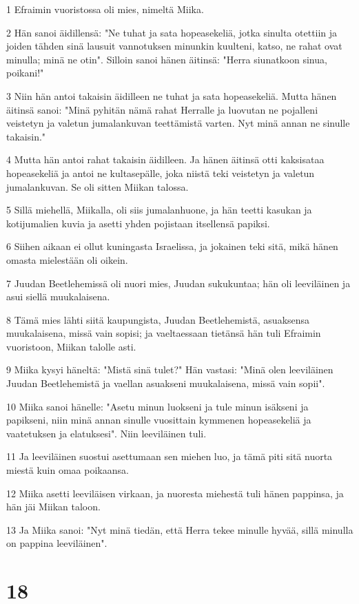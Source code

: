 \par 1 Efraimin vuoristossa oli mies, nimeltä Miika.
\par 2 Hän sanoi äidillensä: "Ne tuhat ja sata hopeasekeliä, jotka sinulta otettiin ja joiden tähden sinä lausuit vannotuksen minunkin kuulteni, katso, ne rahat ovat minulla; minä ne otin". Silloin sanoi hänen äitinsä: "Herra siunatkoon sinua, poikani!"
\par 3 Niin hän antoi takaisin äidilleen ne tuhat ja sata hopeasekeliä. Mutta hänen äitinsä sanoi: "Minä pyhitän nämä rahat Herralle ja luovutan ne pojalleni veistetyn ja valetun jumalankuvan teettämistä varten. Nyt minä annan ne sinulle takaisin."
\par 4 Mutta hän antoi rahat takaisin äidilleen. Ja hänen äitinsä otti kaksisataa hopeasekeliä ja antoi ne kultasepälle, joka niistä teki veistetyn ja valetun jumalankuvan. Se oli sitten Miikan talossa.
\par 5 Sillä miehellä, Miikalla, oli siis jumalanhuone, ja hän teetti kasukan ja kotijumalien kuvia ja asetti yhden pojistaan itsellensä papiksi.
\par 6 Siihen aikaan ei ollut kuningasta Israelissa, ja jokainen teki sitä, mikä hänen omasta mielestään oli oikein.
\par 7 Juudan Beetlehemissä oli nuori mies, Juudan sukukuntaa; hän oli leeviläinen ja asui siellä muukalaisena.
\par 8 Tämä mies lähti siitä kaupungista, Juudan Beetlehemistä, asuaksensa muukalaisena, missä vain sopisi; ja vaeltaessaan tietänsä hän tuli Efraimin vuoristoon, Miikan talolle asti.
\par 9 Miika kysyi häneltä: "Mistä sinä tulet?" Hän vastasi: "Minä olen leeviläinen Juudan Beetlehemistä ja vaellan asuakseni muukalaisena, missä vain sopii".
\par 10 Miika sanoi hänelle: "Asetu minun luokseni ja tule minun isäkseni ja papikseni, niin minä annan sinulle vuosittain kymmenen hopeasekeliä ja vaatetuksen ja elatuksesi". Niin leeviläinen tuli.
\par 11 Ja leeviläinen suostui asettumaan sen miehen luo, ja tämä piti sitä nuorta miestä kuin omaa poikaansa.
\par 12 Miika asetti leeviläisen virkaan, ja nuoresta miehestä tuli hänen pappinsa, ja hän jäi Miikan taloon.
\par 13 Ja Miika sanoi: "Nyt minä tiedän, että Herra tekee minulle hyvää, sillä minulla on pappina leeviläinen".

\chapter{18}

